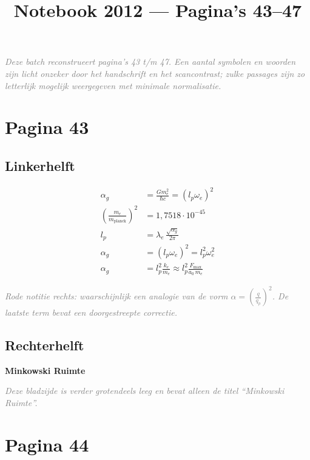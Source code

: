 \documentclass[11pt,a4paper]{article}
\title{Notebook 2012 --- Pagina's 43--47}
\author{}
\date{}
\newcommand{\uncertain}[1]{\textit{\textcolor{gray}{#1}}}
\begin{document}
\maketitle

\uncertain{Deze batch reconstrueert pagina's 43 t/m 47. Een aantal symbolen en woorden zijn licht onzeker door het handschrift en het scancontrast; zulke passages zijn zo letterlijk mogelijk weergegeven met minimale normalisatie.}

\clearpage
\section*{Pagina 43}

\begin{minipage}[t]{0.56\textwidth}
\subsection*{Linkerhelft}
\begin{align*}
\alpha_g &= \frac{G m_e^2}{\hbar c}
           = \left(l_p \omega_e\right)^2
\\[0.4em]
\left(\frac{m_e}{m_{\text{planck}}}\right)^2
&= 1{,}7518 \cdot 10^{-45}
\\[0.4em]
l_p &= \lambda_e \, \frac{\sqrt{\alpha_g}}{2\pi}
\\[0.4em]
\alpha_g &= \left(l_p \omega_e\right)^2 = l_p^2 \omega_e^2
\\[0.4em]
\alpha_g &= l_p^2 \frac{k_e}{m_e}
\approx l_p^2 \frac{F_{\max}}{a_0\,m_e}
\end{align*}

\uncertain{Rode notitie rechts: waarschijnlijk een analogie van de vorm
$\alpha = \left(\frac{q}{q_p}\right)^2$. De laatste term bevat een doorgestreepte correctie.}
\end{minipage}
\hfill
\begin{minipage}[t]{0.38\textwidth}
\subsection*{Rechterhelft}
\textbf{Minkowski Ruimte}

\medskip
\uncertain{Deze bladzijde is verder grotendeels leeg en bevat alleen de titel ``Minkowski Ruimte''.}
\end{minipage}

\clearpage
\section*{Pagina 44}
\end{document}
